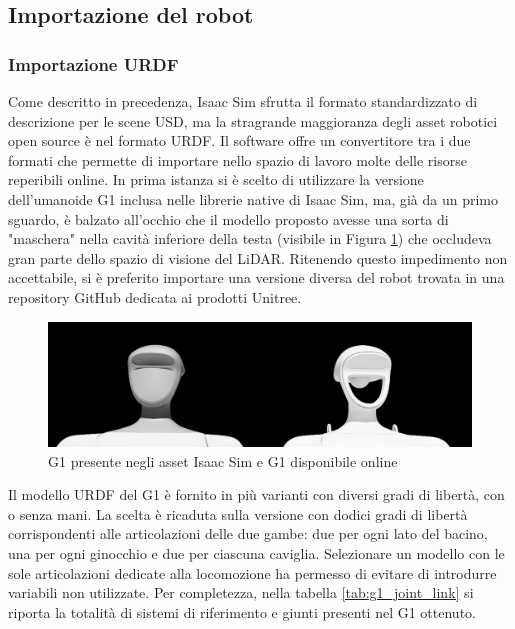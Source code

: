 

\subsection{Importazione del robot}

\subsubsection{Importazione URDF}
Come descritto in precedenza, Isaac Sim sfrutta il formato standardizzato di descrizione per le scene USD, ma la stragrande maggioranza degli asset robotici open source è nel formato URDF. Il software offre un convertitore tra i due formati che permette di importare nello spazio di lavoro molte delle risorse reperibili online. In prima istanza si è scelto di utilizzare la versione dell'umanoide G1 inclusa nelle librerie native di Isaac Sim, ma, già da un primo sguardo, è balzato all'occhio che il modello proposto avesse una sorta di "maschera" nella cavità inferiore della testa (visibile in Figura \ref{fig:confronto_g1}) che occludeva gran parte dello spazio di visione del LiDAR. Ritenendo questo impedimento non accettabile, si è preferito importare una versione diversa del robot trovata in una repository GitHub dedicata ai prodotti Unitree. 

\begin{figure}[h]
    \centering
    \includegraphics[width=0.75\linewidth]{immagini/g1_versions.png}
    \caption{G1 presente negli asset Isaac Sim e G1 disponibile online}
    \label{fig:confronto_g1}
\end{figure}

Il modello URDF del G1 è fornito in più varianti con diversi gradi di libertà, con o senza mani. La scelta è ricaduta sulla versione con dodici gradi di libertà corrispondenti alle articolazioni delle due gambe: due per ogni lato del bacino, una per ogni ginocchio e due per ciascuna caviglia. Selezionare un modello con le sole articolazioni dedicate alla locomozione ha permesso di evitare di introdurre variabili non utilizzate. Per completezza, nella tabella \ref{tab:g1_joint_link} si riporta la totalità di sistemi di riferimento e giunti presenti nel G1 ottenuto.

